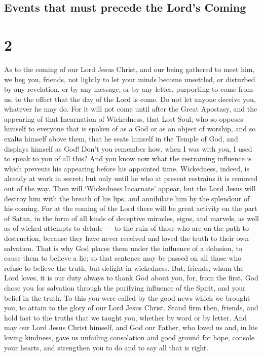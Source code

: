 \hypertarget{events-that-must-precede-the-lords-coming}{%
\subsection{Events that must precede the Lord's
Coming}\label{events-that-must-precede-the-lords-coming}}

\hypertarget{section-1}{%
\section{2}\label{section-1}}

 As to the coming of our Lord Jesus Christ, and our being
gathered to meet him, we beg you, friends,  not lightly to
let your minds become unsettled, or disturbed by any revelation, or by
any message, or by any letter, purporting to come from us, to the effect
that the day of the Lord is come.  Do not let anyone deceive
you, whatever he may do. For it will not come until after the Great
Apostasy, and the appearing of that Incarnation of Wickedness, that Lost
Soul,  who so opposes himself to everyone that is spoken of
as a God or as an object of worship, and so exalts himself above them,
that he seats himself in the Temple of God, and displays himself as God!
 Don't you remember how, when I was with you, I used to
speak to you of all this?  And you know now what the
restraining influence is which prevents his appearing before his
appointed time.  Wickedness, indeed, is already at work in
secret; but only until he who at present restrains it is removed out of
the way.  Then will `Wickedness Incarnate' appear, but the
Lord Jesus will destroy him with the breath of his lips, and annihilate
him by the splendour of his coming.  For at the coming of
the Lord there will be great activity on the part of Satan, in the form
of all kinds of deceptive miracles, signs, and marvels, as well as of
wicked attempts to delude ---  to the ruin of those who are
on the path to destruction, because they have never received and loved
the truth to their own salvation.  That is why God places
them under the influence of a delusion, to cause them to believe a lie;
 so that sentence may be passed on all those who refuse to
believe the truth, but delight in wickedness.  But,
friends, whom the Lord loves, it is our duty always to thank God about
you, for, from the first, God chose you for salvation through the
purifying influence of the Spirit, and your belief in the truth.
 To this you were called by the good news which we brought
you, to attain to the glory of our Lord Jesus Christ. 
Stand firm then, friends, and hold fast to the truths that we taught
you, whether by word or by letter.  And may our Lord Jesus
Christ himself, and God our Father, who loved us and, in his loving
kindness, gave us unfailing consolation and good ground for hope,
 console your hearts, and strengthen you to do and to say
all that is right.

